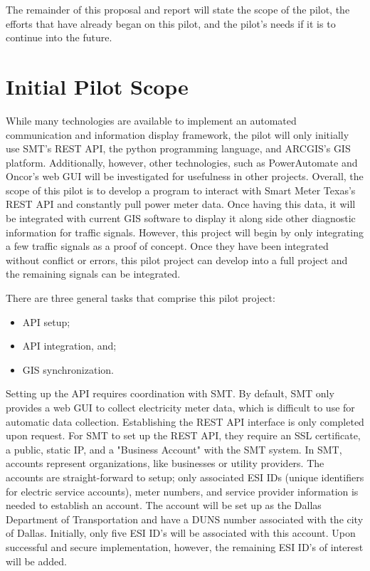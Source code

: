 \documentclass[letterpaper, notitlepage]{report}
\begin{document}
The remainder of this proposal and report will state the scope of the pilot, the efforts that have already began on this pilot, and the pilot's needs if it is to continue into the future.

\section{Initial Pilot Scope}
While many technologies are available to implement an automated communication and information display framework, the pilot will only initially use SMT's REST API, the python programming language, and ARCGIS's GIS platform. Additionally, however, other technologies, such as PowerAutomate and Oncor's web GUI will be investigated for usefulness in other projects. Overall, the scope of this pilot is to develop a program to interact with Smart Meter Texas's REST API and constantly pull power meter data. Once having this data, it will be integrated with current GIS software to display it along side other diagnostic information for traffic signals. However, this project will begin by only integrating a few traffic signals as a proof of concept. Once they have been integrated without conflict or errors, this pilot project can develop into a full project and the remaining signals can be integrated.

There are three general tasks that comprise this pilot project: 
\begin{itemize}
    \item API setup;
    \item API integration, and;
    \item GIS synchronization.
\end{itemize}


Setting up the API requires coordination with SMT. By default, SMT only provides a web GUI to collect electricity meter data, which is difficult to use for automatic data collection. Establishing the REST API interface is only completed upon request. For SMT to set up the REST API, they require an SSL certificate, a public, static IP, and a "Business Account" with the SMT system. 
In SMT, accounts represent organizations, like businesses or utility providers. The accounts are straight-forward to setup; only associated ESI IDs (unique identifiers for electric service accounts), meter numbers, and service provider information is needed to establish an account. The account will be set up as the Dallas Department of Transportation and have a DUNS number associated with the city of Dallas. Initially, only five ESI ID's will be associated with this account. Upon successful and secure implementation, however, the remaining ESI ID's of interest will be added.
\end{document}
